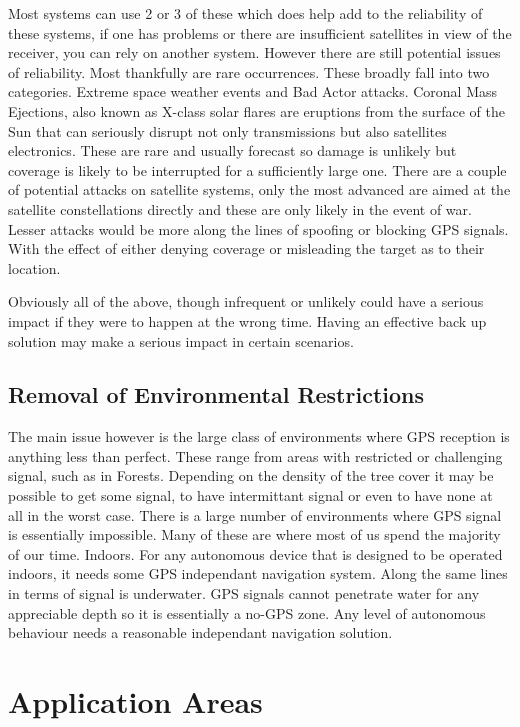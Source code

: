 \documentclass[]{article}
\begin{document}
Most systems can use 2 or 3 of these which does help add to the reliability of these systems, if one has problems or there are insufficient satellites in view of the receiver, you can rely on another system.
However there are still potential issues of reliability. Most thankfully are rare occurrences. 
These broadly fall into two categories. 
Extreme space weather events and Bad Actor attacks. 
Coronal Mass Ejections, also known as X-class solar flares are eruptions from the surface of the Sun that can seriously disrupt not only transmissions but also satellites electronics. 
These are rare and usually forecast so damage is unlikely but coverage is likely to be interrupted for a sufficiently large one.
There are a couple of potential attacks on satellite systems, only the most advanced are aimed at the satellite constellations directly and these are only likely in the event of war.
Lesser attacks would be more along the lines of spoofing or blocking GPS signals. With the effect of either denying coverage or misleading the target as to their location.

Obviously all of the above, though infrequent or unlikely could have a serious impact if they were to happen at the wrong time.
Having an effective back up solution may make a serious impact in certain scenarios.

\subsection{Removal of Environmental Restrictions}

The main issue however is the large class of environments where GPS reception is anything less than perfect. 
These range from areas with restricted or challenging signal, such as in Forests. Depending on the density of the tree cover it may be possible to get some signal, to have intermittant signal or even to have none at all in the worst case.
There is a large number of environments where GPS signal is essentially impossible. Many of these are where most of us spend the majority of our time. Indoors.
For any autonomous device that is designed to be operated indoors, it needs some GPS independant navigation system.
Along the same lines in terms of signal is underwater. GPS signals cannot penetrate water for any appreciable depth so it is essentially a no-GPS zone. 
Any level of autonomous behaviour needs a reasonable independant navigation solution.

\section{Application Areas}
\end{document}
